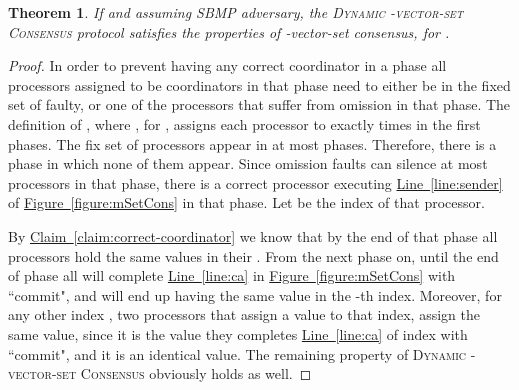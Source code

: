 \documentclass[11pt]{article}
\newtheorem{theorem}{Theorem}
\newcommand{\namedref}[2]{\hyperref[#2]{#1~\ref*{#2}}}
\newcommand{\figureref}[1]{\namedref{Figure}{#1}}
\newcommand{\claimref}[1]{\namedref{Claim}{#1}}
\newcommand{\lref}[1]{\namedref{Line}{#1}}
\newcommand{\SBMPfm}{\mbox{SBMP\!}\xspace}
\newcommand{\kSetCons}{\textsc{Dynamic -vector-set Consensus}\xspace}
\newcommand{\mSetCons}{\textsc{Dynamic -vector-set Consensus}\xspace}
\begin{document}
\begin{theorem}\label{thm:mSetCons}
If  and assuming \SBMPfm adversary, the \mSetCons protocol satisfies the properties of -vector-set consensus, for .
\end{theorem}
\begin{proof}
In order to prevent having any correct coordinator in a phase all  processors assigned to be coordinators in that phase need to either be in the fixed set of  faulty, or one of the  processors that suffer from omission in that phase.
The definition of , where , for ,  assigns each processor  to exactly  times in the first  phases.  The fix set of  processors appear in at most  phases.  Therefore, there is a phase in which none of them appear.  Since omission faults can silence at most  processors in that phase, there is a correct processor executing \lref{line:sender}  of \figureref{figure:mSetCons}  in that phase. Let  be the index of that processor.

By \claimref{claim:correct-coordinator} we know that by the end of  that phase all processors hold the same values in their .  From the next phase on, until the end of phase  all will complete \lref{line:ca} in \figureref{figure:mSetCons} with ``commit", and will end up having the same value in the -th index.  Moreover,  for any other index , two processors that  assign a value to that index, assign the same value, since it is the value they completes \lref{line:ca} of index  with ``commit", and it is an identical value.
The remaining property of \kSetCons obviously holds as well.
\end{proof}




 
\end{document}
